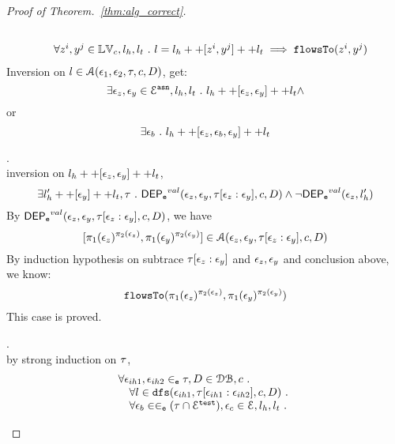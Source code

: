 \documentclass[a4paper,11pt]{article}
\begin{document}
\begin{proof}[Proof of Theorem.~\ref{thm:alg_correct}]
\begin{case}
\[\begin{array}{l}
   \\ \quad 
   \forall z^i, y^j \in \mathbb{LV}_c, l_h, l_t ~.~ 
   l = l_h ++ [z^i, y^j] ++ l_t 
   \implies \mathtt{flowsTo}(z^i, y^j)  
\end{array}
\]
%
Inversion on $l \in \mathcal{A}(\mathtt{\epsilon}_1, \mathtt{\epsilon}_2, \mathtt{\tau}, c, D)$, get:
\[
  \exists \mathtt{\epsilon}_z, \mathtt{\epsilon}_y \in \mathcal{E}^{\mathtt{{asn}}}, l_h, l_t 
  ~.~ l_h ++ [\mathtt{\epsilon}_z, \mathtt{\epsilon}_y] ++ l_t \land 
\]
or
\[
    \exists \mathtt{\epsilon}_b ~.~ l_h ++ [\mathtt{\epsilon}_z, \mathtt{\epsilon}_b, \mathtt{\epsilon}_y] ++ l_t
\]
\begin{subcase}.
\\
inversion on  $l_h ++ {[\mathtt{\epsilon}_z, \mathtt{\epsilon}_y]} ++ l_t$, 
\[
  \exists l_{h}' ++ [\mathtt{\epsilon}_y] ++ l_t, \mathtt{\tau} ~.~
  \mathsf{DEP_{\mathtt{e}}}^{val}(\mathtt{\epsilon}_z, \mathtt{\epsilon}_y, \mathtt{\tau}[\mathtt{\epsilon}_z: \mathtt{\epsilon}_y], c, D)
  \land 
  \neg \mathsf{DEP_{\mathtt{e}}}^{val} (\mathtt{\epsilon}_z, l_h')
\]
%
By $\mathsf{DEP_{\mathtt{e}}}^{val}(\mathtt{\epsilon}_z, \mathtt{\epsilon}_y, \mathtt{\tau}[\mathtt{\epsilon}_z: \mathtt{\epsilon}_y], c, D)$, 
we have
\[
  [\pi_1(\mathtt{\epsilon}_z)^{\pi_2(\mathtt{\epsilon}_z)}, \pi_1(\mathtt{\epsilon}_y)^{\pi_2(\mathtt{\epsilon}_y)}] 
  \in \mathcal{A}(\mathtt{\epsilon}_z, \mathtt{\epsilon}_y, \mathtt{\tau}[\mathtt{\epsilon}_{z}:\mathtt{\epsilon}_{y}], c, D) 
\]
%
By induction hypothesis on subtrace $\mathtt{\tau}[\mathtt{\epsilon}_z: \mathtt{\epsilon}_y]$ and $\mathtt{\epsilon}_z, \mathtt{\epsilon}_y$ and conclusion above, we know:
\[
  \mathtt{flowsTo}(\pi_1(\mathtt{\epsilon}_z)^{\pi_2(\mathtt{\epsilon}_z)}, \pi_1(\mathtt{\epsilon}_y)^{\pi_2(\mathtt{\epsilon}_y)})
\]
This case is proved.
%
%
\end{subcase}
%
\begin{subcase}.
\\
by strong induction on $\mathtt{\tau}$,
\[
\begin{array}{l}
  \forall \mathtt{\epsilon}_{ih1}, \mathtt{\epsilon}_{ih2} \in_{\mathtt{e}} \mathtt{\tau}, D \in \mathcal{DB} , c ~.~
  \\ \quad 
   \forall l \in \mathtt{dfs}(\mathtt{\epsilon}_{ih1}, \mathtt{\tau}[\mathtt{\epsilon}_{ih1}:\mathtt{\epsilon}_{ih2}], c, D) ~.~
   \\ \quad 
   \forall \mathtt{\epsilon}_b \in \in_{\mathtt{e}} (\mathtt{\tau} \cap \mathcal{E}^{\mathtt{{test}}}), \mathtt{\epsilon}_c \in \mathcal{E}, l_h, l_t ~.~ 

\end{array}\]
\end{subcase}
\end{case}
\end{proof}
\end{document}
